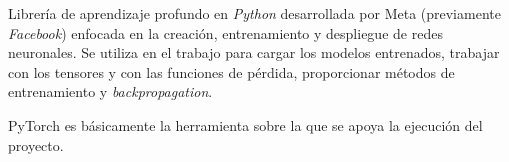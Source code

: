Librería de aprendizaje profundo en \textit{Python} desarrollada por Meta (previamente \textit{Facebook}) enfocada en la creación, entrenamiento y despliegue de redes neuronales. Se utiliza en el trabajo para cargar los modelos entrenados, trabajar con los tensores y con las funciones de pérdida, proporcionar métodos de entrenamiento y \textit{backpropagation}. 

PyTorch es básicamente la herramienta sobre la que se apoya la ejecución del proyecto.